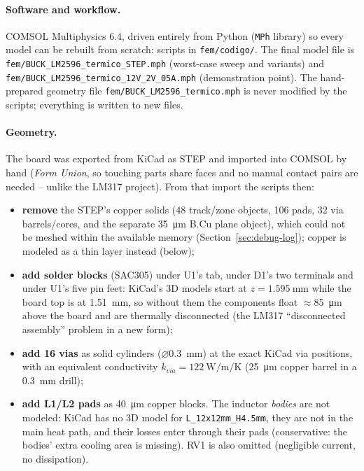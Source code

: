 \documentclass[11pt,letterpaper]{article}
\begin{document}
\paragraph{Software and workflow.} COMSOL Multiphysics 6.4, driven entirely from Python (\texttt{MPh}
library) so every model can be rebuilt from scratch: scripts in \nolinkurl{fem/codigo/}. The final model file
is \nolinkurl{fem/BUCK_LM2596_termico_STEP.mph} (worst-case sweep and variants) and
\nolinkurl{fem/BUCK_LM2596_termico_12V_2V_05A.mph} (demonstration point). The hand-prepared geometry
file \nolinkurl{fem/BUCK_LM2596_termico.mph} is never modified by the scripts; everything is written to new
files.

\paragraph{Geometry.} The board was exported from KiCad as STEP and imported into COMSOL by hand
(\textit{Form Union}, so touching parts share faces and no manual contact pairs are needed -- unlike the
LM317 project). From that import the scripts then:
\begin{itemize}[nosep]
    \item \textbf{remove} the STEP's copper solids (48 track/zone objects, 106 pads, 32 via barrels/cores,
    and the separate \SI{35}{\micro\meter} B.Cu plane object), which could not be meshed within the
    available memory (Section~\ref{sec:debug-log}); copper is modeled as a thin layer instead (below);
    \item \textbf{add solder blocks} (SAC305) under U1's tab, under D1's two terminals and under U1's five
    pin feet: KiCad's 3D models start at $z=\SI{1.595}{\milli\meter}$ while the board top is at
    \SI{1.51}{\milli\meter}, so without them the components float $\approx$\SI{85}{\micro\meter} above
    the board and are thermally disconnected (the LM317 ``disconnected assembly'' problem in a new form);
    \item \textbf{add 16 vias} as solid cylinders ($\varnothing$\SI{0.3}{\milli\meter}) at the exact KiCad
    via positions, with an equivalent conductivity $k_{via}=\SI{122}{\watt\per\meter\per\kelvin}$
    (\SI{25}{\micro\meter} copper barrel in a \SI{0.3}{\milli\meter} drill);
    \item \textbf{add L1/L2 pads} as \SI{40}{\micro\meter} copper blocks. The inductor \emph{bodies} are
    not modeled: KiCad has no 3D model for \texttt{L\_12x12mm\_H4.5mm}, they are not in the main heat
    path, and their losses enter through their pads (conservative: the bodies' extra cooling area is
    missing). RV1 is also omitted (negligible current, no dissipation).
\end{itemize}
\end{document}
